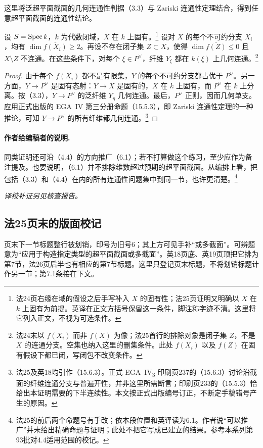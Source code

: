 \begingroup
\def\OO{\mathcal O}\def\FF{\mathcal F}\def\GG{\mathcal G}
\def\PP{\mathbf P}\def\calP{\mathcal P}\def\dd{\delta}
\def\Div{\operatorname{Div}}\def\depth{\operatorname{depth}}
\def\pr{\operatorname{pr}}\def\coker{\operatorname{coker}}
这里将泛超平面截面的几何连通性判据（3.3）与 Zariski 连通性定理结合，得到任意超平面截面的连通性结论。

设 $S=\operatorname{Spec} k$，$k$ 为代数闭域，$X$ 在 $k$ 上固有。\footnote{法24页右缘在域的假设之后手写补入 $X$ 的固有性；法25页证明又明确以 $X$ 在 $k$ 上固有为前提。英译在正文方括号保留这一条件，脚注称字迹不清。这里将它列入正文，不视为可选条件。}
设对 $X$ 的每个不可约分支 $X_i$，均有 $\dim\overline{f(X_i)}\geq2$。再设不存在闭子集 $Z\subset X$，使得 $\dim\overline{f(Z)}\leq0$ 且 $X\setminus Z$ 不连通。在这些条件下，对每个 $\xi\in P^\vee$，纤维 $Y_\xi$ 都在 $k(\xi)$ 上几何连通。\footnote{法24末以 $f(X_i)$ 而非 $f(X)$ 为像；法25首行的排除对象是闭子集 $Z$，不是 $X$ 的连通分支。空集也纳入这里的删集条件。此处 $f(X_i)$ 以及 $f(Z)$ 在固有假设下都已闭，写闭包不改变条件。}

\begin{proof}
由于每个 $f(X_i)$ 都不是有限集，$Y$ 的每个不可约分支都占优于 $P^\vee$。另一方面，$Y\to P^\vee$ 是固有态射：$Y\to X$ 是固有的，$X$ 在 $k$ 上固有，而 $P^\vee$ 在 $k$ 上分离。按（3.3），$Y\to P^\vee$ 的泛纤维 $Y_\eta$ 几何连通。最后，$P^\vee$ 正则，因而几何单支。应用正式出版的 EGA~IV 第三分册命题（15.5.3），即 Zariski 连通性定理的一种推论，可知 $Y\to P^\vee$ 的所有纤维都几何连通。\footnote{法25及英18均引作（15.6.3）。正式 EGA~IV\textsubscript{3} 印刷页237的（15.6.3）讨论沿截面的纤维连通分支与普遍开性，并非这里所需断言；印刷页233的（15.5.3）恰给出本证明需要的下半连续性。本文按正式出版编号订正，不断定手稿错号产生的原因。}
\end{proof}

\paragraph{作者给编稿者的说明.}
同类证明还可沿（4.4）的方向推广（6.1）；若不打算做这个练习，至少应作为备注提及。也要说明，（6.1）并不排除维数超过预期的超平面截面。从编排上看，把包括（3.3）和（4.4）在内的所有连通性问题集中到同一节，也许更清楚。\footnote{法25的前后两个命题号有手改；依本段位置和英译读为6.1。作者说“可以推广”并未给出精确命题与证明；此处不把它写成已建立的结果。参考本系列第93批对4.4适用范围的校记。}

\par\noindent\textit{译校补证另见核查报告。}
\subsection*{法25页末的版面校记}
页末下一节标题整行被划销，印号为旧号6；其上方可见手补“或多截面”。可辨题意为“应用于构造指定类型的超平面截面或多截面”。英18页底、英19页顶把它排为第7节，法26页后半也有相应的第7节标题。这里只登记页末标题，不将划销标题计作另一节；第7.1条接在下文。

\endgroup
